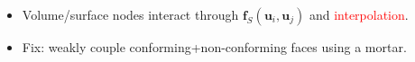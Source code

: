\documentclass[compress]{beamer}
\theoremstyle{plain}
\renewcommand{\note}[1]{\textcolor{red}{{#1}}}
\begin{document}
{\begin{itemize}
\item<1-> Volume/surface nodes interact through $\bm{f}_S(\bm{u}_i,\bm{u}_j)$ and \note{interpolation}.
\vspace{.25em}
\item<2-> Fix: weakly couple conforming+non-conforming faces using a mortar.
\end{itemize}
}

\end{document}
